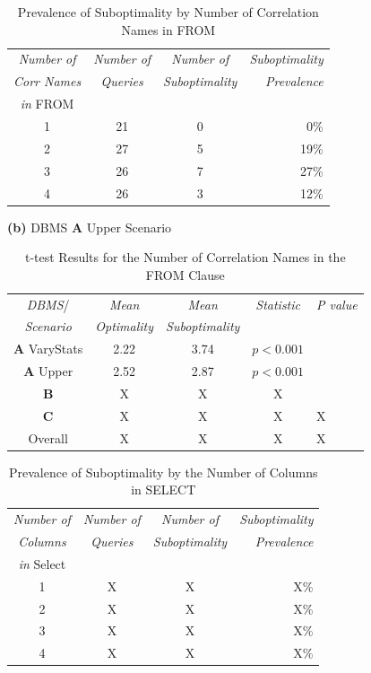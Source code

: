 {\begin{table}[t]
\begin{center}
\begin{tabular}{c|c|c|r}
{\em Number of} & {\em Number of} & {\em Number of} & \multicolumn{1}{|c}{\em Suboptimality}\\
{\em Corr Names}&{\em Queries}&{\em Suboptimality}&{\em Prevalence}\\
{\em in} FROM&&&\\
\hline
1 & 21 & 0 & 0\%\\
2 & 27 & 5 & 19\%\\
3 & 26 & 7 & 27\%\\
4 & 26 & 3 & 12\%
\end{tabular}

\vspace*{1em}

{\bf (b)} DBMS {\bf A} Upper Scenario

\vspace*{1em}

\end{center}
\caption{Prevalence of Suboptimality by Number of Correlation Names in
FROM\label{tab:numcnfrm}}
\end{table}

\begin{table}[t]
\begin{center}
\begin{tabular}{c|c|c|c|l}
{\em DBMS}/ & {\em Mean} & {\em Mean} & {\em Statistic} &
{\em P value} \\
{\em Scenario}&{\em Optimality} & {\em Suboptimality} &\\
\hline
{\bf A} VaryStats&2.22&3.74&$p < 0.001$\\
{\bf A} Upper&2.52&2.87&$p< 0.001$\\
{\bf B}&X&X&X\\
{\bf C}&X&X&X&X\\
Overall&X&X&X&X\\
\end{tabular}
\end{center}
\caption{t-test Results for the Number of Correlation Names in the FROM Clause\label{tab:ttests2}}
\end{table}


\begin{table}
\begin{center}
\begin{tabular}{c|c|c|r}
{\em Number of} & {\em Number of} & {\em Number of} & \multicolumn{1}{|c}{\em Suboptimality}\\
{\em Columns}&{\em Queries}&{\em Suboptimality}&{\em Prevalence}\\
{\em in} Select&&&\\
\hline
1 & X & X & X\%\\
2 & X & X & X\%\\
3 & X & X & X\%\\
4 & X & X & X\%
\end{tabular}
\end{center}
\caption{Prevalence of Suboptimality by the Number of Columns in
SELECT\label{tab:numcnsel}}
\end{table}

}
